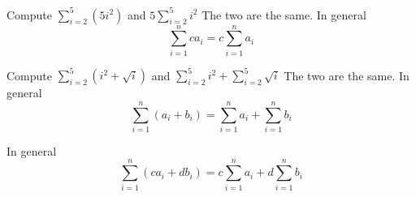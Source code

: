 \mbox{}
\begin{myenum}
\item
        Compute $\sum_{i = 2}^5 (5i^2)$
and 
$5 \sum_{i = 2}^5 i^2$
The two are the same.
In general
\[
\sum_{i = 1}^n c a_i = c\sum_{i = 1}^n a_i
\]
\item Compute
$\sum_{i=2}^5 (i^2 + \sqrt{i})$
and
$\sum_{i=2}^5 i^2 + \sum_{i=2}^5 \sqrt{i}$
The two are the same.
In general
\[
\sum_{i = 1}^n (a_i + b_i) 
= 
\sum_{i = 1}^n a_i + \sum_{i=1}^n b_i 
\]

\item 
In general
\[
\sum_{i = 1}^n (ca_i + db_i) 
= 
c\sum_{i = 1}^n a_i + d\sum_{i=1}^n b_i 
\]

\end{myenum}

